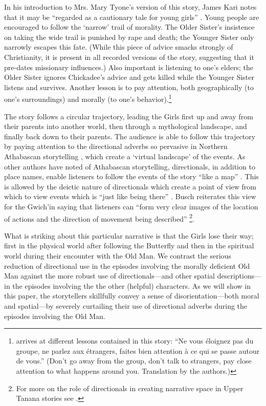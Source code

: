 In his introduction to Mrs. Mary Tyone's version of this story, James Kari notes that it may be ``regarded as a cautionary tale for young girls'' \citep[23]{TyoneM1996}. Young people are encouraged to follow the `narrow' trail of morality. The Older Sister's insistence on taking the wide trail is punished by rape and death; the Younger Sister only narrowly escapes this fate. (While this piece of advice smacks strongly of Christianity, it is present in all recorded versions of the story, suggesting that it pre-dates missionary influences.) Also important is listening to one's elders; the Older Sister ignores Chickadee's advice and gets killed while the Younger Sister listens and survives. Another lesson is to pay attention, both geographically (to one's surroundings) and morally (to one's behavior).\footnote{\citet[468]{GuedonMF2005} arrives at different lessons contained in this story: ``Ne vous éloignez pas du groupe, ne parlez aux étrangers, faites bien attention à ce qui se passe autour de vous.'' (Don't go away from the group, don't talk to strangers, pay close attention to what happens around you. Translation by the authors.)}

The story follows a circular trajectory, leading the Girls first up and away from their parents into another world, then through a mythological landscape, and finally back down to their parents. The audience is able to follow this trajectory by paying attention to the directional adverbs so pervasive in Northern Athabascan storytelling \citep{KariJ2010, KariJ2011}, which create a `virtual landscape' of the events. As other authors have noted of Athabascan storytelling, directionals, in addition to place names, enable listeners to follow the events of the story ``like a map'' \citep[62]{CruikshankJ1990, MoorePTlenD2007}. This is allowed by the deictic nature of directionals which create a point of view from which to view events which is ``just like being there'' \citep[58]{MooreP2002}. Busch reiterates this view for the Gwich'in saying that listeners can ``form very clear images of the location of actions and the direction of movement being described'' \citet[1]{BuschJ2000}\footnote{For more on the role of directionals in creating narrative space in Upper Tanana stories see \citet{BrucksC2015}.}.

What is striking about this particular narrative is that the Girls lose their way; first in the physical world after following the Butterfly and then in the spiritual world during their encounter with the Old Man. We contrast the serious reduction of directional use in the episodes involving the morally deficient Old Man against the more robust use of directionals—and other spatial descriptions—in the episodes involving the the other (helpful) characters. As we will show in this paper, the storytellers skillfully convey a sense of disorientation—both moral and spatial—by severely curtailing their use of directional adverbs during the episodes involving the Old Man.

